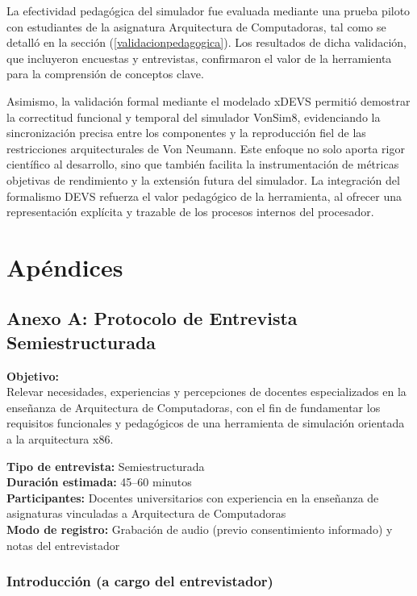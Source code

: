 \documentclass[12pt,oneside]{templates/unerthesis}
\begin{document}
La efectividad pedagógica del simulador fue evaluada mediante una prueba piloto con estudiantes de la asignatura Arquitectura de Computadoras, tal como se detalló en la sección (\ref{validacionpedagogica}). Los resultados de dicha validación, que incluyeron encuestas y entrevistas, confirmaron el valor de la herramienta para la comprensión de conceptos clave.

Asimismo, la validación formal mediante el modelado xDEVS permitió demostrar la correctitud funcional y temporal del simulador VonSim8, evidenciando la sincronización precisa entre los componentes y la reproducción fiel de las restricciones arquitecturales de Von Neumann. Este enfoque no solo aporta rigor científico al desarrollo, sino que también facilita la instrumentación de métricas objetivas de rendimiento y la extensión futura del simulador. La integración del formalismo DEVS refuerza el valor pedagógico de la herramienta, al ofrecer una representación explícita y trazable de los procesos internos del procesador.

\hypertarget{apendices}{%
\chapter{Apéndices}\label{apendices}}

\hypertarget{anexoA}{%
\section{Anexo A: Protocolo de Entrevista Semiestructurada}\label{anexoA}}

\textbf{Objetivo:}\\
Relevar necesidades, experiencias y percepciones de docentes especializados en la enseñanza de Arquitectura de Computadoras, con el fin de fundamentar los requisitos funcionales y pedagógicos de una herramienta de simulación orientada a la arquitectura x86.

\textbf{Tipo de entrevista:} Semiestructurada\\
\textbf{Duración estimada:} 45--60 minutos\\
\textbf{Participantes:} Docentes universitarios con experiencia en la enseñanza de asignaturas vinculadas a Arquitectura de Computadoras\\
\textbf{Modo de registro:} Grabación de audio (previo consentimiento informado) y notas del entrevistador

\hypertarget{introducciuxf3n-a-cargo-del-entrevistador}{%
\subsection{Introducción (a cargo del entrevistador)}\label{introducciuxf3n-a-cargo-del-entrevistador}}
\end{document}
